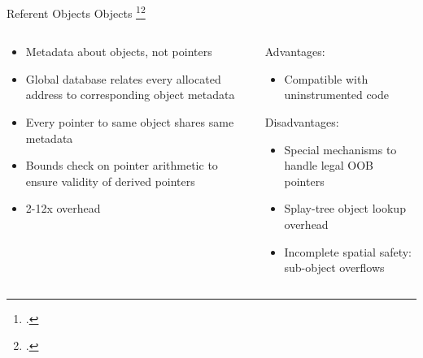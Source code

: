 \documentclass[aspectratio=169]{beamer}
\begin{document}
\begin{frame}[fragile]{Referent Objects}
    Objects \footcite{jones_backwards-compatible_1997}\footcite{ruwase_practical_2004}
\footnotesize
\begin{columns}[T]
\begin{column}{0.45\textwidth}
\begin{itemize}[<+->]
    \item Metadata about \alert{objects}, not pointers
    \item Global database relates every allocated address to corresponding object metadata 
    \item Every pointer to same object shares same metadata
    \item Bounds check on \alert{pointer arithmetic}  to ensure validity of derived pointers 
    \item 2-12x overhead
\end{itemize}
\end{column}

\pause

\begin{column}{0.45\textwidth}
Advantages:
\begin{itemize}
  \item Compatible with uninstrumented code 
\end{itemize}
\pause
Disadvantages:
\begin{itemize}
  \item Special mechanisms to handle legal OOB pointers 
  \item Splay-tree object lookup overhead
  \item Incomplete spatial safety: \alert{sub-object overflows} 
\end{itemize}
\end{column}
\end{columns}

\vspace{0.1in}

\end{frame}
\end{document}
